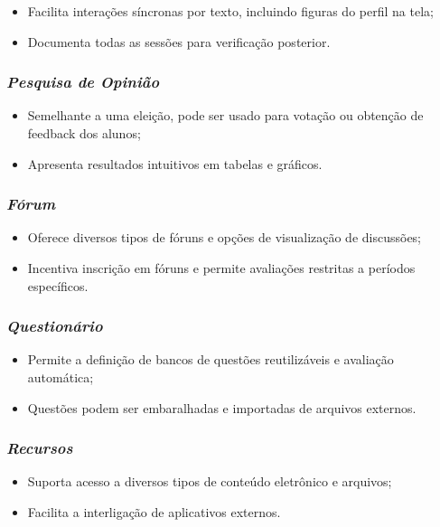\begin{itemize}
    \item Facilita interações síncronas por texto, incluindo figuras do perfil na tela;
    \item Documenta todas as sessões para verificação posterior.
\end{itemize}

\subsubsection{\textbf{\textit{Pesquisa de Opinião}}}

\begin{itemize}
    \item Semelhante a uma eleição, pode ser usado para votação ou obtenção de feedback dos alunos;
    \item Apresenta resultados intuitivos em tabelas e gráficos.
\end{itemize}

\subsubsection{\textbf{\textit{Fórum}}}

\begin{itemize}
    \item Oferece diversos tipos de fóruns e opções de visualização de discussões;
    \item Incentiva inscrição em fóruns e permite avaliações restritas a períodos específicos.
\end{itemize}

\subsubsection{\textbf{\textit{Questionário}}}

\begin{itemize}
    \item Permite a definição de bancos de questões reutilizáveis e avaliação automática;
    \item Questões podem ser embaralhadas e importadas de arquivos externos.
\end{itemize}

\subsubsection{\textbf{\textit{Recursos}}}

\begin{itemize}
    \item Suporta acesso a diversos tipos de conteúdo eletrônico e arquivos;
    \item Facilita a interligação de aplicativos externos.
\end{itemize}

